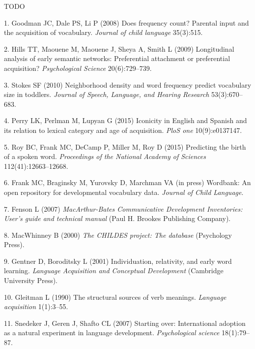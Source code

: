 \documentclass[9pt,twocolumn,twoside]{pnas-new}
\begin{document}
TODO

\showmatmethods
\showacknow
\pnasbreak

\hypertarget{refs}{}
\hypertarget{ref-goodman2008}{}
1. Goodman JC, Dale PS, Li P (2008) Does frequency count? Parental input
and the acquisition of vocabulary. \emph{Journal of child language}
35(3):515.

\hypertarget{ref-hills2009}{}
2. Hills TT, Maouene M, Maouene J, Sheya A, Smith L (2009) Longitudinal
analysis of early semantic networks: Preferential attachment or
preferential acquisition? \emph{Psychological Science} 20(6):729--739.

\hypertarget{ref-stokes2010}{}
3. Stokes SF (2010) Neighborhood density and word frequency predict
vocabulary size in toddlers. \emph{Journal of Speech, Language, and
Hearing Research} 53(3):670--683.

\hypertarget{ref-perry2015}{}
4. Perry LK, Perlman M, Lupyan G (2015) Iconicity in English and Spanish
and its relation to lexical category and age of acquisition. \emph{PloS
one} 10(9):e0137147.

\hypertarget{ref-roy2015}{}
5. Roy BC, Frank MC, DeCamp P, Miller M, Roy D (2015) Predicting the
birth of a spoken word. \emph{Proceedings of the National Academy of
Sciences} 112(41):12663--12668.

\hypertarget{ref-frankinpress}{}
6. Frank MC, Braginsky M, Yurovsky D, Marchman VA (in press) Wordbank:
An open repository for developmental vocabulary data. \emph{Journal of
Child Language}.

\hypertarget{ref-fenson2007}{}
7. Fenson L (2007) \emph{MacArthur-Bates Communicative Development
Inventories: User's guide and technical manual} (Paul H. Brookes
Publishing Company).

\hypertarget{ref-macwhinney2000}{}
8. MacWhinney B (2000) \emph{The CHILDES project: The database}
(Psychology Press).

\hypertarget{ref-gentner2001}{}
9. Gentner D, Boroditsky L (2001) Individuation, relativity, and early
word learning. \emph{Language Acquisition and Conceptual Development}
(Cambridge University Press).

\hypertarget{ref-gleitman1990}{}
10. Gleitman L (1990) The structural sources of verb meanings.
\emph{Language acquisition} 1(1):3--55.

\hypertarget{ref-snedeker2007}{}
11. Snedeker J, Geren J, Shafto CL (2007) Starting over: International
adoption as a natural experiment in language development.
\emph{Psychological science} 18(1):79--87.
\end{document}
